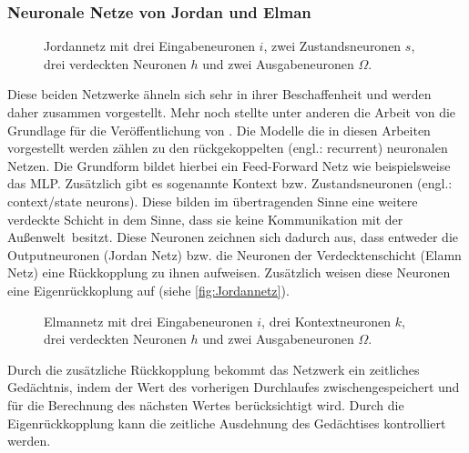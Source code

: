 \subsubsection{Neuronale Netze von Jordan und Elman}%
\begin{figure}[!htb]
    \centering
        
    \caption[Darstellung eines Jordannetzes]{Jordannetz mit drei Eingabeneuronen $i$, zwei Zustandsneuronen $s$, drei verdeckten Neuronen $h$ und zwei Ausgabeneuronen $\Omega$.}
    \label{fig:Jordannetz}
\end{figure}

Diese beiden Netzwerke ähneln sich sehr in ihrer Beschaffenheit und werden daher zusammen vorgestellt. Mehr noch stellte unter anderen die Arbeit von \citet{Jordan1986} die Grundlage für die Veröffentlichung von \citet{Elman1990}. Die Modelle die in diesen Arbeiten vorgestellt werden zählen zu den rückgekoppelten (engl.: recurrent) neuronalen Netzen. Die Grundform bildet hierbei ein Feed-Forward Netz wie beispielsweise das MLP. Zusätzlich gibt es sogenannte Kontext bzw. Zustandsneuronen (engl.: context/state neurons). Diese bilden im übertragenden Sinne eine weitere verdeckte Schicht in dem Sinne, dass sie keine Kommunikation mit der \glqq Außenwelt\grqq~besitzt. Diese Neuronen zeichnen sich dadurch aus, dass entweder die Outputneuronen (Jordan Netz) bzw. die Neuronen der Verdecktenschicht (Elamn Netz) eine Rückkopplung zu ihnen aufweisen. Zusätzlich weisen diese Neuronen eine Eigenrückkoplung auf (siehe \autoref{fig:Jordannetz}). 

\begin{figure}[!htb]
    \centering
        
    \caption[Darstellung eines Elmannetzes]{Elmannetz mit drei Eingabeneuronen $i$, drei Kontextneuronen $k$, drei verdeckten Neuronen $h$ und zwei Ausgabeneuronen $\Omega$.}
    \label{fig:Elman}
\end{figure}

Durch die zusätzliche Rückkopplung bekommt das Netzwerk ein zeitliches Gedächtnis, indem der Wert des vorherigen Durchlaufes zwischengespeichert und für die Berechnung des nächsten Wertes berücksichtigt wird. Durch die Eigenrückkopplung kann die zeitliche Ausdehnung des Gedächtises kontrolliert werden. 


